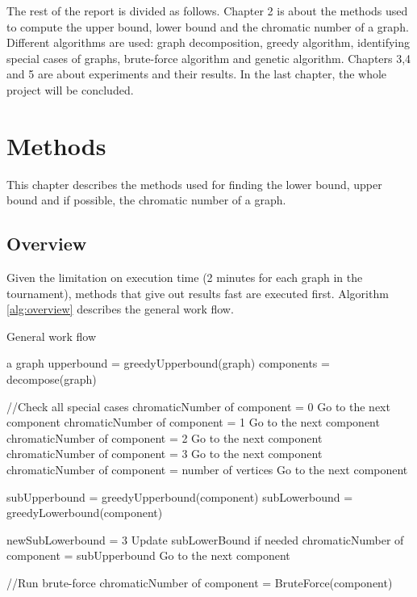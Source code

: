 \documentclass[a4paper]{report}
\begin{document}
	The rest of the report is divided as follows. Chapter 2 is about the methods used to compute the upper bound, lower bound and the chromatic number of a graph. Different algorithms are used: graph decomposition, greedy algorithm, identifying special cases of graphs, brute-force algorithm and genetic algorithm. Chapters 3,4 and 5 are about experiments and their results. In the last chapter, the whole project will be concluded.
	
	\chapter{Methods}
	This chapter describes the methods used for finding the lower bound, upper bound and if possible, the chromatic number of a graph. 
	\section{Overview}
	Given the limitation on execution time (2 minutes for each graph in the tournament), methods that give out results fast are executed first. Algorithm \ref{alg:overview} describes the general work flow.\\
	\begin{algorithm}
		\caption{General work flow}
		\label{alg:overview}
		\begin{algorithmic}[1]
			\REQUIRE a graph
			\STATE upperbound = greedyUpperbound(graph)
			\STATE components = decompose(graph)
				
				\STATE//Check all special cases
					\STATE chromaticNumber of component = 0
					\STATE Go to the next component
				\ENDIF
				\STATE chromaticNumber of component = 1
				\STATE Go to the next component
				\ENDIF
				\STATE chromaticNumber of component = 2
				\STATE Go to the next component
				\ENDIF
				\STATE chromaticNumber of component = 3
				\STATE Go to the next component
				\ENDIF
				\STATE chromaticNumber of component = number of vertices
				\STATE Go to the next component
				\ENDIF
				
				\STATE subUpperbound =  greedyUpperbound(component)
				\STATE subLowerbound =  greedyLowerbound(component)
				
				\STATE newSubLowerbound = 3
				\STATE Update subLowerBound if needed
				\STATE chromaticNumber of component = subUpperbound
				\STATE Go to the next component
				\ENDIF
				
				\STATE//Run brute-force
				\STATE chromaticNumber of component = BruteForce(component)
				\ENDIF 
			\ENDFOR

			\end{algorithmic}
		\end{algorithm}
\end{document}
